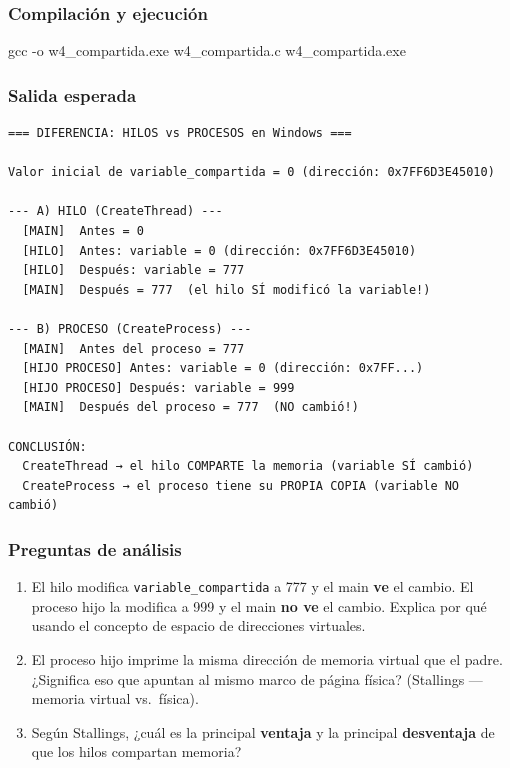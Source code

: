 \documentclass[
  spanish,
]{article}
\newenvironment{Shaded}{}{}
\newcommand{\AttributeTok}[1]{\textcolor[rgb]{0.49,0.56,0.16}{#1}}
\newcommand{\NormalTok}[1]{#1}
\providecommand{\tightlist}{%
  \setlength{\itemsep}{0pt}\setlength{\parskip}{0pt}}
\begin{document}
\subsubsection{Compilación y
ejecución}\label{compilaciuxf3n-y-ejecuciuxf3n-3}

\begin{Shaded}
\begin{Highlighting}[]
\NormalTok{gcc }\AttributeTok{{-}o}\NormalTok{ w4\_compartida.exe w4\_compartida.c}
\NormalTok{w4\_compartida.exe}
\end{Highlighting}
\end{Shaded}

\subsubsection{Salida esperada}\label{salida-esperada-3}

\begin{verbatim}
=== DIFERENCIA: HILOS vs PROCESOS en Windows ===

Valor inicial de variable_compartida = 0 (dirección: 0x7FF6D3E45010)

--- A) HILO (CreateThread) ---
  [MAIN]  Antes = 0
  [HILO]  Antes: variable = 0 (dirección: 0x7FF6D3E45010)
  [HILO]  Después: variable = 777
  [MAIN]  Después = 777  (el hilo SÍ modificó la variable!)

--- B) PROCESO (CreateProcess) ---
  [MAIN]  Antes del proceso = 777
  [HIJO PROCESO] Antes: variable = 0 (dirección: 0x7FF...)
  [HIJO PROCESO] Después: variable = 999
  [MAIN]  Después del proceso = 777  (NO cambió!)

CONCLUSIÓN:
  CreateThread → el hilo COMPARTE la memoria (variable SÍ cambió)
  CreateProcess → el proceso tiene su PROPIA COPIA (variable NO cambió)
\end{verbatim}

\subsubsection{Preguntas de análisis}\label{preguntas-de-anuxe1lisis-3}

\begin{enumerate}
\def\labelenumi{\arabic{enumi}.}
\tightlist
\item
  El hilo modifica \texttt{variable\_compartida} a 777 y el main
  \textbf{ve} el cambio. El proceso hijo la modifica a 999 y el main
  \textbf{no ve} el cambio. Explica por qué usando el concepto de
  espacio de direcciones virtuales.
\item
  El proceso hijo imprime la misma dirección de memoria virtual que el
  padre. ¿Significa eso que apuntan al mismo marco de página física?
  (Stallings --- memoria virtual vs.~física).
\item
  Según Stallings, ¿cuál es la principal \textbf{ventaja} y la principal
  \textbf{desventaja} de que los hilos compartan memoria?
\end{enumerate}
\end{document}
